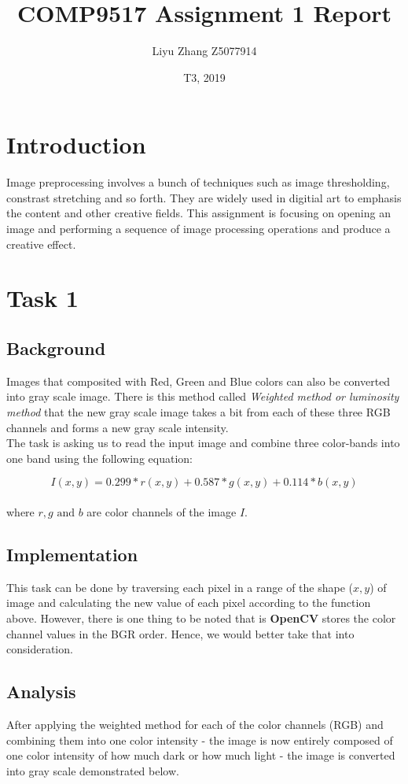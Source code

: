 \documentclass{article}
\title{COMP9517 Assignment 1 Report}
\date{T3, 2019}
\author{Liyu Zhang Z5077914}
\begin{document}
\maketitle

\section{Introduction}
Image preprocessing involves a bunch of techniques such as image thresholding,
constrast stretching and so forth. They are widely used in digitial art to
emphasis the content and other creative fields. This assignment is focusing on
opening an image and performing a sequence of image processing operations and
produce a creative effect.

\clearpage

\section{Task 1}
\subsection{Background}
Images that composited with Red, Green and Blue colors can also be converted into gray scale image. There is this method called \textit{Weighted method or luminosity method} that the new gray scale image takes a bit from each of these three RGB channels and forms a new gray scale intensity. \\[1ex]
The task is asking us to read the input image and combine three color-bands into
one band using the following equation:

$$ I(x,y) = 0.299 * r(x,y) + 0.587 * g(x,y) + 0.114 * b(x,y) $$
\\
where $r, g \text{ and } b$ are color channels of the image $I$.

\subsection{Implementation}
This task can be done by traversing each pixel in a range of the shape ($x,y$) of image
and calculating the new value of each pixel according to the function above.
However, there is one thing to be noted that is \textbf{OpenCV} stores the color
channel values in the BGR order. Hence, we would better take that into consideration. 

\subsection{Analysis}
After applying the weighted method for each of the color channels (RGB) and combining them into one color intensity - the image is now entirely composed of one color intensity of how much dark or how much light - the image is converted into gray scale demonstrated below.
\end{document}
